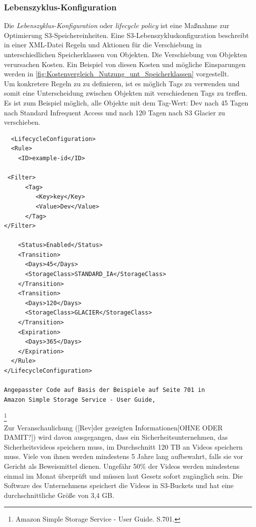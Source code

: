\subsubsection{Lebenszyklus-Konfiguration}
Die \textit{Lebenszyklus-Konfiguration} oder \textit{lifecycle policy} ist eine Maßnahme zur Optimierung S3-Speichereinheiten. Eine S3-Lebenszykluskonfiguration beschreibt in einer XML-Datei Regeln und Aktionen für die Verschiebung in unterschiedlichen Speicherklassen von Objekten. Die Verschiebung von Objekten verursachen Kosten. Ein Beispiel von diesen Kosten und mögliche Einsparungen werden in \autoref{fig:Kostenvergleich_Nutzung_unt_Speicherklassen} vorgestellt.
\\
Um konkretere Regeln zu zu definieren, ist es möglich Tags zu verwenden und somit eine Unterscheidung zwischen Objekten mit verschiedenen Tags zu treffen. Es ist zum Beispiel möglich, alle Objekte mit dem Tag-Wert: Dev nach 45 Tagen nach Standard Infrequent Access und nach 120 Tagen nach S3 Glacier zu verschieben.
\begin{lstlisting}
  <LifecycleConfiguration>
  <Rule>
    <ID>example-id</ID>
    
 <Filter>
      <Tag>
         <Key>key</Key>
         <Value>Dev</Value>
      </Tag>
</Filter>

    <Status>Enabled</Status>
    <Transition>
      <Days>45</Days>
      <StorageClass>STANDARD_IA</StorageClass>
    </Transition>
    <Transition>
      <Days>120</Days>
      <StorageClass>GLACIER</StorageClass>
    </Transition>
    <Expiration>
      <Days>365</Days>
    </Expiration>
  </Rule>
</LifecycleConfiguration>

Angepasster Code auf Basis der Beispiele auf Seite 701 in 
Amazon Simple Storage Service - User Guide, 
\end{lstlisting}
\footnote{Amazon Simple Storage Service - User Guide. S.701.\cite{AMZ18}}\\
Zur Veranschaulichung ([Rev]der gezeigten Informationen[OHNE ODER DAMIT?]) wird davon ausgegangen, dass ein Sicherheitsunternehmen, das Sicherheitsvideos speichern muss, im Durchschnitt 120 TB an Videos speichern muss. Viele von ihnen werden mindestens 5 Jahre lang aufbewahrt, falls sie vor Gericht als Beweismittel dienen. Ungefähr 50\% der Videos werden mindestens einmal im Monat überprüft und müssen laut Gesetz sofort zugänglich sein. Die Software des Unternehmens speichert die Videos in S3-Buckets und hat eine durchschnittliche Größe von 3,4 GB.

